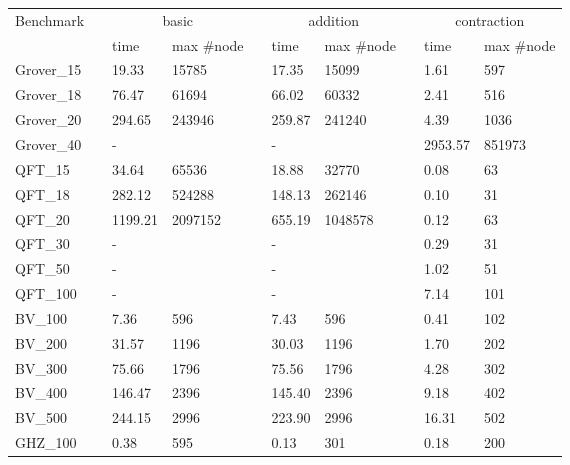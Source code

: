 \begin{table}[!htbp]
    \centering
    \begin{tabular}{llllllllll}
        \hline
        \multirow{2}{*}{Benchmark} &  & \multicolumn{2}{c}{basic} &  & \multicolumn{2}{c}{addition} &  & \multicolumn{2}{c}{contraction} \\ \cline{3-4} \cline{6-7} \cline{9-10} 
                                   &  & time        & max \#node       &  & time          & max \#node        &  & time           & max \#node          \\ \hline
        Grover\_15 &   & 19.33  & 15785     &   & 17.35      & 15099  & & 1.61 & 597  \\
        Grover\_18 &   & 76.47  & 61694     &   & 66.02      & 60332  & & 2.41 & 516  \\
        Grover\_20 &   & 294.65 & 243946    &   & 259.87     & 241240 & & 4.39  & 1036 \\ 
        Grover\_40 &   & -      &           &   & -          &        & & 2953.57 & 851973 \\
        \hline
        QFT\_15     &  & 34.64   & 65536   &  & 18.88  & 32770   &  & 0.08 & 63  \\
        QFT\_18     &  & 282.12  & 524288  &  & 148.13 & 262146 &   & 0.10  & 31  \\
        QFT\_20     &  & 1199.21 & 2097152 &  & 655.19 & 1048578 &  & 0.12 & 63  \\
        QFT\_30     &  & -       &         &  & -      &        &  & 0.29 & 31  \\
        QFT\_50     &  & -       &         &  & -      &        &  & 1.02 & 51  \\
        QFT\_100    &  & -       &         &  & -      &        &  & 7.14 & 101 \\
        \hline
        BV\_100     &  & 7.36    & 596     &  & 7.43      & 596     &  & 0.41           & 102 \\
        BV\_200     &  & 31.57   & 1196    &  & 30.03     & 1196    &  & 1.70           & 202 \\
        BV\_300     &  & 75.66   & 1796    &  & 75.56     & 1796    &  & 4.28           & 302 \\
        BV\_400     &  & 146.47  & 2396    &  & 145.40    & 2396    &  & 9.18           & 402 \\
        BV\_500     &  & 244.15  & 2996    &  & 223.90    & 2996    &  & 16.31          & 502 \\
        \hline
        GHZ\_100    &  & 0.38    & 595     &  & 0.13      & 301    &  & 0.18           & 200 \\%

\end{tabular}
\end{table}
